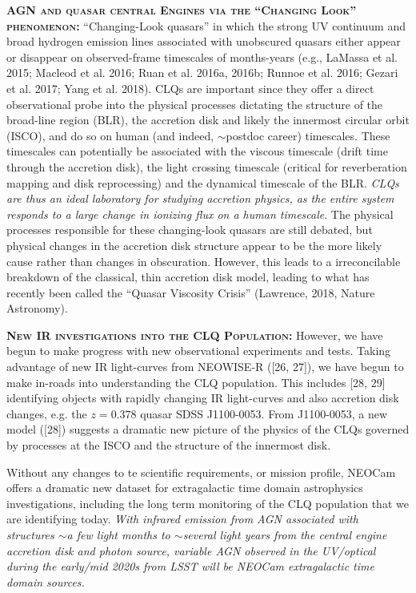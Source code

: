 \documentclass[12pt]{article}
\begin{document}
\smallskip
\smallskip
\noindent
\textbf{\textsc{AGN and quasar central Engines via the ``Changing Look'' phenomenon: }} 
``Changing-Look quasars'' 
 in which the strong UV continuum and broad hydrogen emission lines associated with unobscured quasars either appear or disappear on observed-frame timescales of months-years (e.g., LaMassa et al. 2015; Macleod et al. 2016; Ruan et al. 2016a, 2016b; Runnoe et al. 2016; Gezari et al. 2017; Yang et al. 2018). 
CLQs are important since they offer a direct observational probe into the physical processes dictating the structure of the broad-line region (BLR), the accretion disk and likely the innermost circular orbit (ISCO), 
and do so on human (and indeed, $\sim$postdoc career) timescales. 
These timescales can potentially be associated with the viscous timescale (drift time through the accretion disk), the light crossing timescale (critical for reverberation mapping and disk reprocessing) and the dynamical timescale of the BLR.  {\it CLQs are thus an ideal laboratory for studying accretion physics, as the entire system responds to a large change in ionizing flux on a human timescale}. 
The physical processes responsible for these changing-look quasars are still debated, but physical changes in the accretion disk structure appear to be the more likely cause rather than changes in obscuration. However, this leads to a irreconcilable breakdown of the classical, thin accretion disk model, leading to what has recently been called the ``Quasar Viscosity Crisis'' (Lawrence, 2018, Nature Astronomy). 

\smallskip
\smallskip
\noindent
\textbf{\textsc{New IR investigations into the CLQ Population:}}
However, we have begun to make progress with new observational
experiments and tests.  Taking advantage of new IR light-curves from
NEOWISE-R ([26, 27]), we have begun to make in-roads into
understanding the CLQ population.  This includes [28, 29] identifying
objects with rapidly changing IR light-curves and also accretion disk
changes, e.g. the $z=0.378$ quasar SDSS J1100-0053. From J1100-0053, a
new model ([28]) suggests a dramatic new picture of the physics of the
CLQs governed by processes at the ISCO and the structure of the
innermost disk.

\smallskip
\smallskip
\noindent
Without any changes to te scientific requirements, or mission profile, NEOCam offers 
a dramatic new dataset for extragalactic time domain astrophysics investigations, including
the long term monitoring of the CLQ population that we are identifying today.
{\it With infrared emission from AGN associated with structures $\sim$a few light months to $\sim$several light years from the central engine accretion disk and photon source, variable AGN observed in the UV/optical during the early/mid 2020s from LSST will be NEOCam extragalactic time domain sources.}
\end{document}
